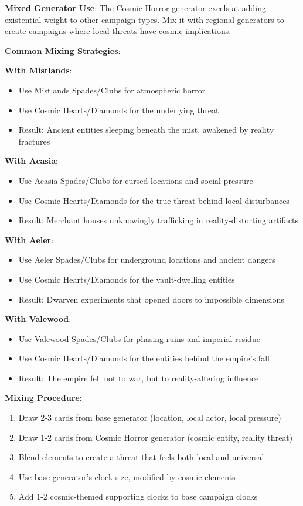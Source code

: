 \documentclass[11pt]{article}
\begin{document}
\begin{mdframed}[backgroundcolor=sanitybg]
\textbf{Mixed Generator Use}:
The Cosmic Horror generator excels at adding existential weight to other campaign types. Mix it with regional generators to create campaigns where local threats have cosmic implications.

\textbf{Common Mixing Strategies}:

\textbf{With Mistlands}:
\begin{itemize}[leftmargin=*]
\item Use Mistlands Spades/Clubs for atmospheric horror
\item Use Cosmic Hearts/Diamonds for the underlying threat
\item Result: Ancient entities sleeping beneath the mist, awakened by reality fractures
\end{itemize}

\textbf{With Acasia}:
\begin{itemize}[leftmargin=*]
\item Use Acasia Spades/Clubs for cursed locations and social pressure
\item Use Cosmic Hearts/Diamonds for the true threat behind local disturbances
\item Result: Merchant houses unknowingly trafficking in reality-distorting artifacts
\end{itemize}

\textbf{With Aeler}:
\begin{itemize}[leftmargin=*]
\item Use Aeler Spades/Clubs for underground locations and ancient dangers
\item Use Cosmic Hearts/Diamonds for the vault-dwelling entities
\item Result: Dwarven experiments that opened doors to impossible dimensions
\end{itemize}

\textbf{With Valewood}:
\begin{itemize}[leftmargin=*]
\item Use Valewood Spades/Clubs for phasing ruins and imperial residue
\item Use Cosmic Hearts/Diamonds for the entities behind the empire's fall
\item Result: The empire fell not to war, but to reality-altering influence
\end{itemize}

\textbf{Mixing Procedure}:
\begin{enumerate}[leftmargin=*]
\item Draw 2-3 cards from base generator (location, local actor, local pressure)
\item Draw 1-2 cards from Cosmic Horror generator (cosmic entity, reality threat)
\item Blend elements to create a threat that feels both local and universal
\item Use base generator's clock size, modified by cosmic elements
\item Add 1-2 cosmic-themed supporting clocks to base campaign clocks
\end{enumerate}
\end{mdframed}
\end{document}
